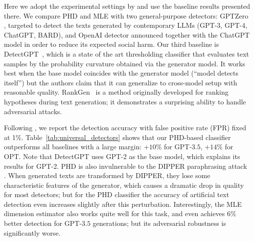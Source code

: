 \documentclass{article}
\begin{document}
Here we adopt the experimental settings by \citet{krishna2023paraphrasing} and use the baseline results presented there. We compare PHD and MLE with two general-purpose detectors: GPTZero \citep{GPTZeroDetector}, targeted to detect the texts generated by contemporary LLMs (GPT-3, GPT-4, ChatGPT, BARD), and OpenAI detector \citep{OpenAIDetector} announced together with the ChatGPT model in order to reduce its expected social harm. Our third baseline is DetectGPT~\citep{mitchell2023detectgpt}, which is a state of the art thresholding classifier that evaluates text samples by the probability curvature obtained via the generator model. It works best when the base model coincides with the generator model (``model detects itself'') but the authors claim that it can generalize to cross-model setup with reasonable quality. %
RankGen~\citep{krishna2022rankgen} is a method originally developed for ranking hypotheses during text generation; it demonstrates a surprising ability to handle adversarial attacks. 


Following \citet{krishna2023paraphrasing}, we report the detection accuracy with false positive rate (FPR) fixed at 1\%. Table~\ref{tab:universal_detectors} shows that our PHD-based classifier outperforms all baselines with a large margin: $+10\%$ for GPT-$3.5$, $+14\%$ for OPT. Note that DetectGPT uses GPT-2 as the base model, which explains its results for GPT-2.
PHD is also invulnerable to the DIPPER paraphrasing attack \citep{krishna2023paraphrasing}. When generated texts are transformed by DIPPER, they lose some characteristic features of the generator, which causes a dramatic drop in quality for most detectors; but for the PHD classifier the accuracy of artificial text detection even increases slightly after this perturbation.
Interestingly, the MLE dimension estimator also works quite well for this task, and even achieves $6\%$ better detection for GPT-$3.5$ generations; but its adversarial robustness is significantly worse. 
\end{document}
